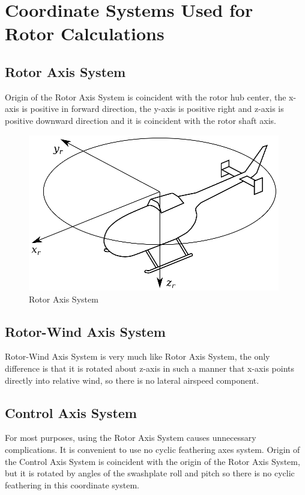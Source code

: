 \section{Coordinate Systems Used for Rotor Calculations}

\subsection{Rotor Axis System}

Origin of the Rotor Axis System is coincident with the rotor hub center, the x-axis is positive in forward direction, the y-axis is positive right and z-axis is positive downward direction and it is coincident with the rotor shaft axis.

\begin{figure}[h!]
  \centering
  \includegraphics[width=110mm]{eps/coordinate_system_RAS.eps}
  \caption{Rotor Axis System}
\end{figure}

\subsection{Rotor-Wind Axis System}

Rotor-Wind Axis System is very much like Rotor Axis System, the only difference is that it is rotated about z-axis in such a manner that x-axis points directly into relative wind, so there is no lateral airspeed component.

\subsection{Control Axis System}

For most purposes, using the Rotor Axis System causes unnecessary complications. It is convenient to use no cyclic feathering axes system. \cite{GessowMyers1985} Origin of the Control Axis System is coincident with the origin of the Rotor Axis System, but it is rotated by angles of the swashplate roll and pitch so there is no cyclic feathering in this coordinate system.

